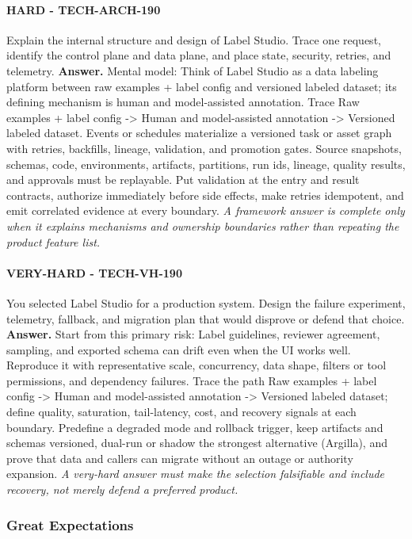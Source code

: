 \paragraph{HARD - TECH-ARCH-190} Explain the internal structure and design of Label Studio. Trace one request, identify the control plane and data plane, and place state, security, retries, and telemetry.
\textbf{Answer.} Mental model: Think of Label Studio as a data labeling platform between raw examples + label config and versioned labeled dataset; its defining mechanism is human and model-assisted annotation. Trace Raw examples + label config -> Human and model-assisted annotation -> Versioned labeled dataset. Events or schedules materialize a versioned task or asset graph with retries, backfills, lineage, validation, and promotion gates. Source snapshots, schemas, code, environments, artifacts, partitions, run ids, lineage, quality results, and approvals must be replayable. Put validation at the entry and result contracts, authorize immediately before side effects, make retries idempotent, and emit correlated evidence at every boundary.
\textit{A framework answer is complete only when it explains mechanisms and ownership boundaries rather than repeating the product feature list.}
\paragraph{VERY-HARD - TECH-VH-190} You selected Label Studio for a production system. Design the failure experiment, telemetry, fallback, and migration plan that would disprove or defend that choice.
\textbf{Answer.} Start from this primary risk: Label guidelines, reviewer agreement, sampling, and exported schema can drift even when the UI works well. Reproduce it with representative scale, concurrency, data shape, filters or tool permissions, and dependency failures. Trace the path Raw examples + label config -> Human and model-assisted annotation -> Versioned labeled dataset; define quality, saturation, tail-latency, cost, and recovery signals at each boundary. Predefine a degraded mode and rollback trigger, keep artifacts and schemas versioned, dual-run or shadow the strongest alternative (Argilla), and prove that data and callers can migrate without an outage or authority expansion.
\textit{A very-hard answer must make the selection falsifiable and include recovery, not merely defend a preferred product.}
\subsubsection*{Great Expectations}
